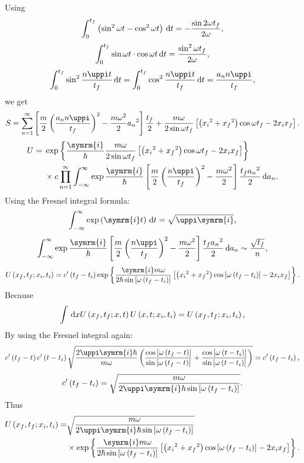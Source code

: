 \documentclass[11pt,fleqn]{article}
\def\ii{\symrm{i}}
\newcommand{\dd}{\,\mathrm{d}}
\begin{document}
Using 
\[\int_0^{t_f}\left(\sin^2\omega t-\cos^2\omega t\right)\,\mathrm{d} t=-\frac{\sin2\omega t_f}{2\omega}\text{,}\]
\[\int_0^{t_f}\sin\omega t\cdot\cos\omega t\,\mathrm{d} t=\frac{\sin^2\omega t_f}{2\omega}\text{,}\]
\[\int_0^{t_f}\sin^2\frac{n\piup t}{t_f} \ndd t=\int_0^{t_f}\cos^2\frac{n\piup t}{t_f} \ndd t=\frac{a_n n \piup}{t_f}\ec\]
we get
\[S=\sum_{n=1}^\infty\left[\frac{m}{2}\lb\frac{a_n n \piup}{t_f}\rb^2-\frac{m\omega^2}{2}{a_n}^2\right]\frac{t_f}{2}+\frac{m\omega}{2\sin\omega t_f}\left[\lb {x_i}^2+{x_f}^2\rb\cos\omega t_f-2 x_i x_f\right]\ed\]
\[\begin{split}U={}&\exp\left\{\frac{\ii}{\hbar}\frac{m\omega}{2\sin\omega t_f}\left[\lb {x_i}^2+{x_f}^2\rb\cos\omega t_f-2 x_i x_f\right]\right\}\\%
&{}\times c\prod_{n=1}^{\infty}\int_{-\infty}^\infty\exp{\frac{\ii}{\hbar}\left[\frac{m}{2}\lb\frac{n \piup}{t_f}\rb^2-\frac{m\omega^2}{2}\right]\frac{t_f {a_n}^2}{2}}\ndd a_n\ed\end{split}\]
Using the Fresnel integral formula:
\[\int_{-\infty}^\infty\exp\lb \ii t\rb\ndd t=\sqrt{\piup \ii}\ec\]
\[\int_{-\infty}^\infty\exp{\frac{\ii}{\hbar}\left[\frac{m}{2}\lb\frac{n \piup}{t_f}\rb^2-\frac{m\omega^2}{2}\right]\frac{t_f {a_n}^2}{2}}\ndd a_n\sim\frac{\sqrt{t_f}}{n}\ec\]
\[U\lb x_f,t_f;x_i,t_i\rb=c'\lb t_f-t_i\rb\exp\left\{\frac{\ii m\omega}{2\hbar\sin\left[\omega \lb t_f-t_i\rb\right]}\left[\lb {x_i}^2+{x_f}^2\rb\cos\left[\omega\lb t_f-t_i\rb\right]-2 x_i x_f\right]\right\}\ed\]
Because \[\int\dd x U\lb x_f,t_f;x,t\rb U\lb x,t;x_i,t_i\rb=U\lb x_f,t_f;x_i,t_i\rb\ec\]
By using the Fresnel integral again:
\[c'\lb t_f-t\rb c'\lb t-t_i\rb\sqrt{\frac{2 \piup \ii \hbar}{m \omega}\lb\frac{\cos\left[\omega\lb t_f-t\rb\right]}{\sin\left[\omega\lb t_f-t\rb\right]}+\frac{\cos\left[\omega\lb t-t_i\rb\right]}{\sin\left[\omega\lb t-t_i\rb\right]}\rb}=c'\lb t_f-t_i\rb\ec\]
\[c'\lb t_f-t_i\rb=\sqrt{\frac{m\omega}{2\piup \ii \hbar\sin\left[\omega\lb t_f-t_i\rb\right]}}\ed\]
Thus
\[\begin{split}U\lb x_f,t_f;x_i,t_i\rb=&\sqrt{\frac{m\omega}{2\piup \ii \hbar\sin\left[\omega\lb t_f-t_i\rb\right]}}\\&{}\times\exp\left\{\frac{\ii m\omega}{2\hbar\sin\left[\omega \lb t_f-t_i\rb\right]}\left[\lb {x_i}^2+{x_f}^2\rb\cos\left[\omega\lb t_f-t_i\rb\right]-2 x_i x_f\right]\right\}\ed\end{split}\]
\end{document}
